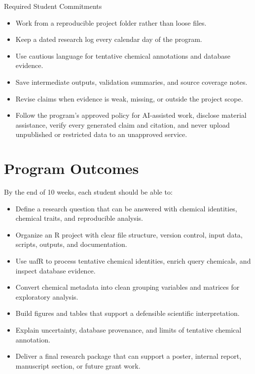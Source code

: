 \begin{checklistbox}{Required Student Commitments}
\begin{itemize}
  \item Work from a reproducible project folder rather than loose files.
  \item Keep a dated research log every calendar day of the program.
  \item Use cautious language for tentative chemical annotations and database evidence.
  \item Save intermediate outputs, validation summaries, and source coverage notes.
  \item Revise claims when evidence is weak, missing, or outside the project scope.
  \item Follow the program's approved policy for AI-assisted work, disclose material assistance, verify every generated claim and citation, and never upload unpublished or restricted data to an unapproved service.
\end{itemize}
\end{checklistbox}

\section*{Program Outcomes}
By the end of 10 weeks, each student should be able to:
\begin{itemize}
  \item Define a research question that can be answered with chemical identities, chemical traits, and reproducible analysis.
  \item Organize an R project with clear file structure, version control, input data, scripts, outputs, and documentation.
  \item Use uafR to process tentative chemical identities, enrich query chemicals, and inspect database evidence.
  \item Convert chemical metadata into clean grouping variables and matrices for exploratory analysis.
  \item Build figures and tables that support a defensible scientific interpretation.
  \item Explain uncertainty, database provenance, and limits of tentative chemical annotation.
  \item Deliver a final research package that can support a poster, internal report, manuscript section, or future grant work.
\end{itemize}

